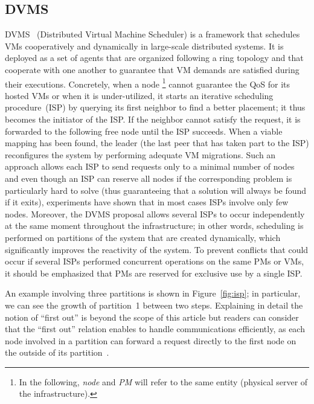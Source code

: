 \subsection{DVMS}\label{ssec:dvms}

DVMS~\cite{quesnel:ispa2013,quesnel:cpe2012} (Distributed Virtual Machine Scheduler) is a
framework that schedules VMs cooperatively and dynamically in large-scale distributed
systems. It is deployed as a set of agents that are organized following a ring topology
and that cooperate with one another to guarantee that VM demands are satisfied during
their executions. Concretely, when a node \footnote{In the following, 
\emph{node} and \emph{PM} will refer to the same entity (\ie physical 
server of the infrastructure).} cannot guarantee the QoS for its hosted VMs or
when it is under-utilized, it starts an iterative scheduling procedure~(ISP) by querying
its first neighbor to find a better placement; it thus becomes the initiator of the ISP.
If the neighbor cannot satisfy the request, it is forwarded to the following free
node until the ISP succeeds. When a viable mapping has been found, the leader (\ie the last
peer that has taken part to the ISP) reconfigures the system by performing adequate VM
migrations. Such an approach allows each ISP to send requests only to a minimal number of
nodes and even though an ISP can reserve all nodes if the corresponding problem is
particularly hard to solve (thus guaranteeing that a solution will always be found if it
exits), experiments have shown that in most cases ISPs involve only few
nodes. Moreover, the DVMS proposal allows several ISPs to occur independently at the same
moment throughout the infrastructure; in other words, scheduling is performed on
partitions of the system that are created dynamically, which significantly improves the
reactivity of the system. To prevent conflicts that could occur if several ISPs performed
concurrent operations on the same PMs or VMs, it should be emphasized that PMs are reserved for
exclusive use by a single ISP.

An example involving three partitions is shown in Figure~\ref{fig:isp}; in particular, we
can see the growth of partition~1 between two steps. Explaining in detail the notion of
``first out'' is beyond the scope of this article but readers can consider that the
``first out'' relation enables to handle communications efficiently, as each node involved
in a partition can forward a request directly to the first node on the outside of its
partition~\cite{quesnel:cpe2012}.

